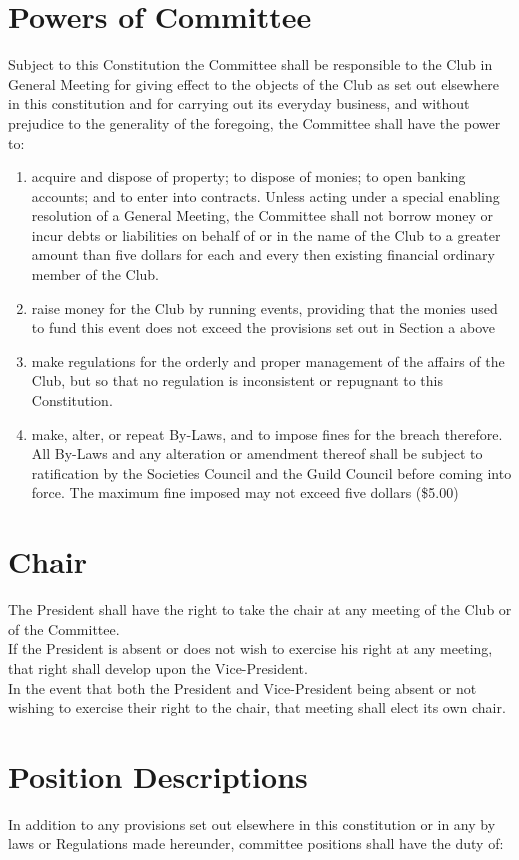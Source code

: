 \documentclass[10pt,a4paper]{report}
\begin{document}
	\section{Powers of Committee}
	Subject to this Constitution the Committee shall be responsible to the Club in General Meeting for giving effect to the objects of the Club as set out elsewhere in this constitution and for carrying out its everyday business, and without prejudice to the generality of the foregoing, the Committee shall have the power to:
	\begin{enumerate}[label=\alph*]
		\item acquire and dispose of property; to dispose of monies; to open banking accounts; and to enter into contracts. Unless acting under a special enabling resolution of a General Meeting, the Committee shall not borrow money or incur debts or liabilities on behalf of or in the name of the Club to a greater amount than five dollars for each and every then existing financial ordinary member of the Club.
		\item raise money for the Club by running events, providing that the monies used to fund this event does not exceed the provisions set out in Section a above
		\item make regulations for the orderly and proper management of the affairs of the Club, but so that no regulation is inconsistent or repugnant to this Constitution.
		\item make, alter, or repeat By-Laws, and to impose fines for the breach therefore. All By-Laws and any alteration or amendment thereof shall be subject to ratification by the Societies Council and the Guild Council before coming into force. The maximum fine imposed may not exceed five dollars (\$5.00)
	\end{enumerate}

	\section{Chair}
	The President shall have the right to take the chair at any meeting of the Club or of the Committee. \\
	If the President is absent or does not wish to exercise his right at any meeting, that right shall develop upon the Vice-President. \\
	In the event that both the President and Vice-President being absent or not wishing to exercise their right to the chair, that meeting shall elect its own chair.
	
	\section{Position Descriptions}
	In addition to any provisions set out elsewhere in this constitution or in any by laws or Regulations made hereunder, committee positions shall have the duty of:
\end{document}
